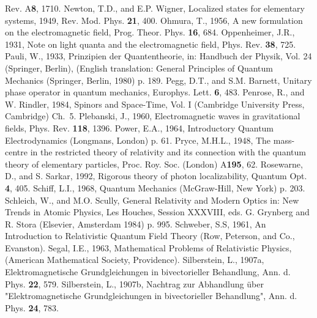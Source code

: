 \documentclass{article}
\begin{document}
\begin{thebibliography}{References}
Rev. A{\bf 8}, 1710.
 Newton, T.D., and E.P. Wigner,
Localized states for elementary systems, 1949, Rev. Mod. Phys. {\bf 21},
400.
 Ohmura, T., 1956, A new formulation on
the electromagnetic field, Prog. Theor. Phys. {\bf 16}, 684.
 Oppenheimer, J.R., 1931, Note
on light quanta and the electromagnetic field, Phys. Rev. {\bf 38}, 725.
 Pauli, W., 1933, Prinzipien der
Quantentheorie, in: Handbuch der Physik, Vol. 24 (Springer, Berlin),
(English translation: General Principles of Quantum Mechanics (Springer,
Berlin, 1980) p. 189.
 Pegg, D.T., and S.M. Barnett,
Unitary phase operator in quantum mechanics, Europhys. Lett. {\bf 6}, 483.
 Penrose, R., and W. Rindler,
1984, Spinors and Space-Time, Vol. I (Cambridge University Press, Cambridge)
Ch.~5.
 Plebanski, J., 1960,
Electromagnetic waves in gravitational fields, Phys. Rev. {\bf 118}, 1396.
 Power, E.A., 1964, Introductory Quantum
Electrodynamics (Longmans, London) p. 61.
 Pryce, M.H.L., 1948, The mass-centre in
the restricted theory of relativity and its connection with the quantum
theory of elementary particles, Proc. Roy. Soc. (London) A{\bf 195}, 62.
 Rosewarne, D., and S. Sarkar,
1992, Rigorous theory of photon localizability, Quantum Opt. {\bf 4}, 405.
 Schiff, L.I., 1968, Quantum Mechanics
(McGraw-Hill, New York) p. 203.
 Schleich, W., and M.O. Scully,
General Relativity and Modern Optics in: New Trends in Atomic Physics, Les
Houches, Session XXXVIII, eds. G. Grynberg and R. Stora (Elsevier, Amsterdam
1984) p. 995.
 Schweber, S.S, 1961, An
Introduction to Relativistic Quantum Field Theory (Row, Peterson, and Co.,
Evanston).
 Segal, I.E., 1963, Mathematical Problems
of Relativistic Physics, (American Mathematical Society, Providence).
 Silberstein, L., 1907a,
Elektromagnetische Grundgleichungen in bivectorieller Behandlung, Ann. d.
Phys. {\bf 22}, 579.
 Silberstein, L., 1907b,
Nachtrag zur Abhandlung \"uber "Elektromagnetische Grundgleichungen in
bivectorieller Behandlung", Ann. d. Phys. {\bf 24}, 783.

\end{thebibliography}
\end{document}
